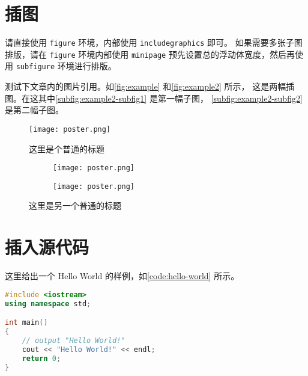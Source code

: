 \documentclass[lang=chs, degree=phd, blindreview=false, winfonts=true]{yanputhesis}
\begin{document}
\section{插图}

请直接使用 \lstinline`figure` 环境，内部使用 \lstinline`includegraphics` 即可。
如果需要多张子图排版，请在 \lstinline`figure` 环境内部使用 \lstinline`minipage`
预先设置总的浮动体宽度，然后再使用 \lstinline`subfigure` 环境进行排版。

测试下文章内的图片引用。如\autoref{fig:example} 和\autoref{fig:example2} 所示，
这是两幅插图。在这其中\autoref{subfig:example2-subfig1} 是第一幅子图，
\autoref{subfig:example2-subfig2} 是第二幅子图。

\begin{figure}[htb]
    \centering
    \texttt{[image: poster.png]}
    \caption{
        这里是个普通的标题
    }
    \label{fig:example}
\end{figure}

\begin{figure}[htb]
    \centering
    \begin{minipage}[t]{0.96\textwidth}
        \centering
        \begin{subfigure}[t]{0.47\textwidth}
            \centering
            \texttt{[image: poster.png]}
            \caption{\label{subfig:example2-subfig1}}
        \end{subfigure}
        \begin{subfigure}[t]{0.47\textwidth}
            \centering
            \texttt{[image: poster.png]}
            \caption{\label{subfig:example2-subfig2}}
        \end{subfigure}
    \end{minipage}
    \caption{这里是另一个普通的标题}
    \label{fig:example2}
\end{figure}

\section{插入源代码}

这里给出一个 Hello World 的样例，如\autoref{code:hello-world} 所示。

\begin{lstlisting}[language={C++}, label={code:hello-world},
    caption={Hello World.cpp}]
#include <iostream>
using namespace std;

int main()
{
    // output "Hello World!"
    cout << "Hello World!" << endl;
    return 0;
}
\end{lstlisting}
\end{document}
